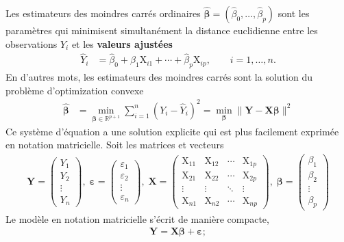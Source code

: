 \documentclass[
  11pt,
  letterpaper,
]{article}
\theoremstyle{definition}
\theoremstyle{definition}
\theoremstyle{definition}
\theoremstyle{definition}
\theoremstyle{remark}
\begin{document}
Les estimateurs des moindres carrés ordinaires \(\widehat{\boldsymbol{\beta}}=(\widehat{\beta}_0, \ldots, \widehat{\beta}_p)\) sont les paramètres qui minimisent simultanément la distance euclidienne entre les observations \(Y_i\) et les \textbf{valeurs ajustées}
\begin{align*}
 \widehat{Y}_i &= \widehat{\beta}_0 + \widehat{\beta}_1 \mathrm{X}_{i1} + \cdots + \widehat{\beta}_p \mathrm{X}_{ip}, \qquad i =1, \ldots, n.
\end{align*}
En d'autres mots, les estimateurs des moindres carrés sont la solution du problème d'optimization convexe
\begin{align*}
\widehat{\boldsymbol{\beta}} &=\min_{\boldsymbol{\beta} \in \mathbb{R}^{p+1}}\sum_{i=1}^n (Y_i-\widehat{Y}_i)^2= \min_{\boldsymbol{\beta}} \|\boldsymbol{Y}-\mathbf{X}\boldsymbol{\beta}\|^2
\end{align*}
Ce système d'équation a une solution explicite qui est plus facilement exprimée en notation matricielle. Soit les matrices et vecteurs
\begin{align*}
\boldsymbol{Y} =
 \begin{pmatrix}
  Y_1 \\
  Y_2 \\
  \vdots \\
  Y_n
 \end{pmatrix} ,
 \;
 \boldsymbol{\varepsilon} =
 \begin{pmatrix}
  \varepsilon_1 \\
  \varepsilon_2 \\
  \vdots \\
  \varepsilon_n
 \end{pmatrix} ,
 \;
\mathbf{X} = \begin{pmatrix}
\mathrm{X}_{11} & \mathrm{X}_{12} & \cdots & \mathrm{X}_{1p} \\
\mathrm{X}_{21} & \mathrm{X}_{22} & \cdots & \mathrm{X}_{2p} \\
\vdots & \vdots & \ddots & \vdots \\
\mathrm{X}_{n1} & \mathrm{X}_{n2} & \cdots & \mathrm{X}_{np}
\end{pmatrix} , \;
\boldsymbol{\beta} =
 \begin{pmatrix}
  \beta_1 \\
  \beta_2 \\
  \vdots \\
  \beta_p
 \end{pmatrix}
\end{align*}
Le modèle en notation matricielle s'écrit de manière compacte, \begin{align*}
\boldsymbol{Y} = \mathbf{X} \boldsymbol{\beta} + \boldsymbol{\varepsilon};
\end{align*}
\end{document}
